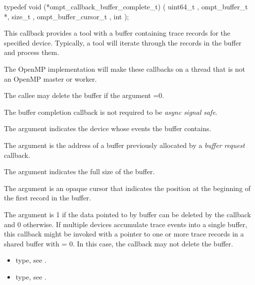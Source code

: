 \format

\begin{ccppspecific}
\begin{omptCallback}
typedef void (*ompt_callback_buffer_complete_t) (
  uint64_t ,
  ompt_buffer_t *,
  size_t ,
  ompt_buffer_cursor_t ,
  int 
);
\end{omptCallback}
\end{ccppspecific}


\descr
This callback provides a tool with a buffer containing trace records for the
specified device. Typically, a tool will iterate through the records
in the buffer and process them.

The OpenMP implementation will make these callbacks
on a thread that is not an OpenMP master or worker.

The callee may delete the buffer if the argument
=0.

The buffer completion callback is not
required to be \emph{async signal safe}.

\argdesc

The argument  indicates the device whose events
the buffer contains.

The argument  is the address of a buffer previously
allocated by a \emph{buffer request} callback.

The argument  indicates the full size of the buffer.

The argument  is an opaque cursor that indicates the
position at the beginning of the first record in the buffer.

The argument  is 1 if the data pointed to by
buffer can be deleted by the callback and 0 otherwise. If multiple
devices accumulate trace events into a single buffer, this callback
might be invoked with a pointer to one or more trace records in a
shared buffer with  = 0. In this case, the callback
may not delete the buffer.

\crossreferences
\begin{itemize}
\item {} type, see
.
\item {} type, see
.
\end{itemize}

\label{sec:ompt_callback_control_tool_t}
\format

